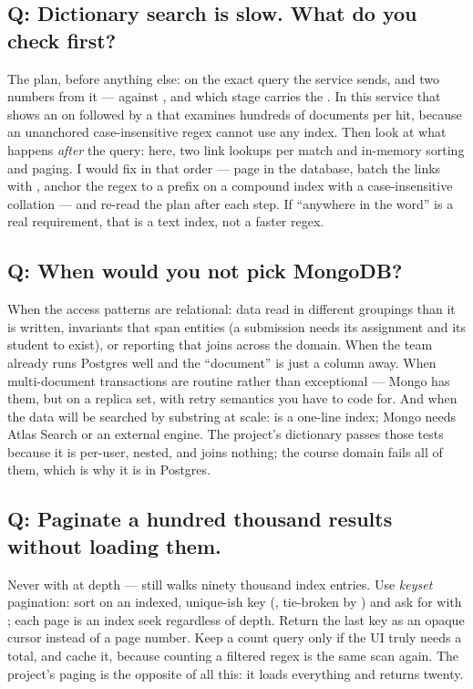 \subsection*{Q: Dictionary search is slow. What do you check first?}

The plan, before anything else:  on
the exact query the service sends, and two numbers from it ---
 against , and which stage
carries the . In this service that shows an 
on  followed by a  that examines
hundreds of documents per hit, because an unanchored case-insensitive
regex cannot use any index. Then look at what happens \emph{after} the
query: here, two link lookups per match and in-memory sorting and
paging. I would fix in that order --- page in the database, batch the
links with , anchor the regex to a prefix on a compound
 index with a case-insensitive collation
--- and re-read the plan after each step. If ``anywhere in the word''
is a real requirement, that is a text index, not a faster regex.

\subsection*{Q: When would you not pick MongoDB?}

When the access patterns are relational: data read in different
groupings than it is written, invariants that span entities
(a submission needs its assignment and its student to exist), or
reporting that joins across the domain. When the team already runs
Postgres well and the ``document'' is just a  column away.
When multi-document transactions are routine rather than exceptional
--- Mongo has them, but on a replica set, with retry semantics you have
to code for. And when the data will be searched by substring at scale:
 is a one-line index; Mongo needs Atlas Search or an
external engine. The project's dictionary passes those tests because it
is per-user, nested, and joins nothing; the course domain fails all of
them, which is why it is in Postgres.

\subsection*{Q: Paginate a hundred thousand results without loading them.}

Never with  at depth ---  still walks
ninety thousand index entries. Use \emph{keyset} pagination: sort on an
indexed, unique-ish key (, tie-broken by ) and
ask for  with ; each
page is an index seek regardless of depth. Return the last key as an
opaque cursor instead of a page number. Keep a count query only if the
UI truly needs a total, and cache it, because counting a filtered
regex is the same scan again. The project's  paging is
the opposite of all this: it loads everything and returns twenty.

